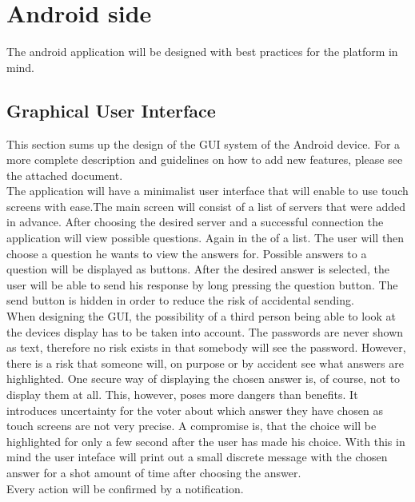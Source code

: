\documentclass[11pt,twoside,a4paper]{book}
\begin{document}
\section{Android side}
The android application will be designed with best practices for the platform in mind.

\subsection{Graphical User Interface}
This section sums up the design of the GUI system of the Android device. For a more complete description and guidelines on how to add new features, please see the attached document.\\
The application will have a minimalist user interface that will enable to use touch screens with ease.The main screen will consist of a list of servers that were added in advance. After choosing the desired server and a successful connection the application will view possible questions. Again in the of a list. The user will then choose a question he wants to view the answers for. Possible answers to a question will be displayed as  buttons. After the desired answer is selected, the user will be able to send his response by long pressing the question button. The send button is hidden in order to reduce the risk of accidental sending. \\
When designing the GUI, the possibility of a third person being able to look at the devices display has to be taken into account. The passwords are never shown as text, therefore no risk exists in that somebody will see the password. However, there is a risk that someone will, on purpose or by accident see what answers are highlighted. One secure way of displaying the chosen answer is, of course, not to display them at all. This, however, poses more dangers than benefits. It introduces uncertainty for the voter about which answer they have chosen as touch screens are not very precise. A compromise is, that the choice will be highlighted for only a few second after the user has made his choice. With this in mind the user inteface will print out a small discrete message with the chosen answer for a shot amount of time after choosing the answer. \\
Every action will be confirmed by a notification.\cite{bakalarkaJV}	
\end{document}
